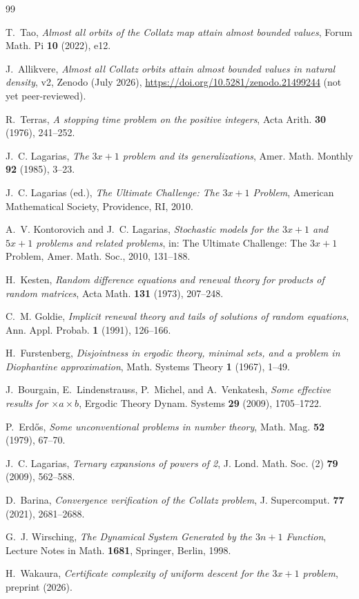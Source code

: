 \documentclass[11pt]{article}
\theoremstyle{definition}
\begin{document}
\begin{thebibliography}{99}

T.~Tao,
\emph{Almost all orbits of the Collatz map attain almost bounded values},
Forum Math. Pi \textbf{10} (2022), e12.

J.~Allikvere,
\emph{Almost all Collatz orbits attain almost bounded values in natural
density}, v2, Zenodo (July 2026), \url{https://doi.org/10.5281/zenodo.21499244}
(not yet peer-reviewed).

R.~Terras,
\emph{A stopping time problem on the positive integers},
Acta Arith. \textbf{30} (1976), 241--252.

J.~C. Lagarias,
\emph{The $3x+1$ problem and its generalizations},
Amer. Math. Monthly \textbf{92} (1985), 3--23.

J.~C. Lagarias (ed.),
\emph{The Ultimate Challenge: The $3x+1$ Problem},
American Mathematical Society, Providence, RI, 2010.

A.~V. Kontorovich and J.~C. Lagarias,
\emph{Stochastic models for the $3x+1$ and $5x+1$ problems and related
problems}, in: The Ultimate Challenge: The $3x+1$ Problem, Amer. Math.
Soc., 2010, 131--188.

H.~Kesten,
\emph{Random difference equations and renewal theory for products of
random matrices},
Acta Math. \textbf{131} (1973), 207--248.

C.~M. Goldie,
\emph{Implicit renewal theory and tails of solutions of random equations},
Ann. Appl. Probab. \textbf{1} (1991), 126--166.

H.~Furstenberg,
\emph{Disjointness in ergodic theory, minimal sets, and a problem in
Diophantine approximation},
Math. Systems Theory \textbf{1} (1967), 1--49.

J.~Bourgain, E.~Lindenstrauss, P.~Michel, and A.~Venkatesh,
\emph{Some effective results for $\times a\times b$},
Ergodic Theory Dynam. Systems \textbf{29} (2009), 1705--1722.

P.~Erd\H{o}s,
\emph{Some unconventional problems in number theory},
Math. Mag. \textbf{52} (1979), 67--70.

J.~C. Lagarias,
\emph{Ternary expansions of powers of 2},
J. Lond. Math. Soc. (2) \textbf{79} (2009), 562--588.

D.~Barina,
\emph{Convergence verification of the Collatz problem},
J. Supercomput. \textbf{77} (2021), 2681--2688.

G.~J. Wirsching,
\emph{The Dynamical System Generated by the $3n+1$ Function},
Lecture Notes in Math. \textbf{1681}, Springer, Berlin, 1998.

H.~Wakaura,
\emph{Certificate complexity of uniform descent for the $3x+1$ problem},
preprint (2026).

\end{thebibliography}
\end{document}
